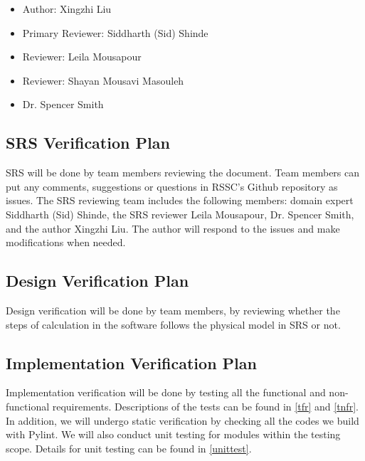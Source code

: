 \documentclass[12pt, titlepage]{article}
\begin{document}
\begin{itemize}
	\item Author: Xingzhi Liu
\end{itemize}

\begin{itemize}
	\item Primary Reviewer: Siddharth (Sid) Shinde
\end{itemize}

\begin{itemize}
	\item Reviewer: Leila Mousapour
\end{itemize}

\begin{itemize}
	\item Reviewer: Shayan Mousavi Masouleh
\end{itemize}

\begin{itemize}
	\item Dr. Spencer Smith
\end{itemize}

\subsection{SRS Verification Plan}

SRS will be done by team members reviewing the document. Team members can put
any comments, suggestions or questions in RSSC's Github repository as issues. The
SRS reviewing team includes the following members: domain expert Siddharth (Sid) Shinde, 
the SRS reviewer Leila Mousapour, Dr. Spencer Smith, and the author Xingzhi Liu.
The author will respond to the issues and make modifications when needed.

\subsection{Design Verification Plan}

Design verification will be done by team members, by reviewing whether the steps 
of calculation in the software follows the physical model in SRS or not. 

\subsection{Implementation Verification Plan}

Implementation verification will be done by testing all the functional and non-functional requirements. Descriptions of the tests can be found in \autoref{tfr} and \autoref{tnfr}. 
In addition, we will undergo static verification by checking
all the codes we build with Pylint. We will also conduct unit testing for modules
within the testing scope. Details for unit testing can be found in \autoref{unittest}.
\end{document}
